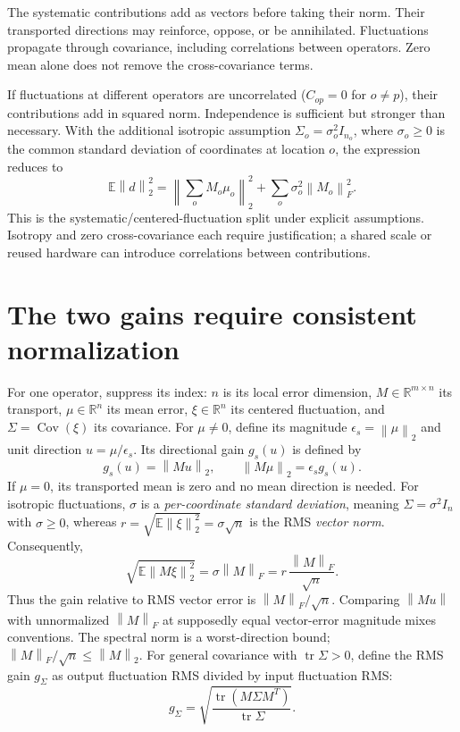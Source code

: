 \documentclass[10pt,a4paper]{article}
\newcommand{\R}{\mathbb{R}}
\newcommand{\E}{\mathbb{E}}
\newcommand{\norm}[1]{\left\lVert#1\right\rVert}
\DeclareMathOperator{\tr}{tr}
\DeclareMathOperator{\Cov}{Cov}
\begin{document}
The systematic contributions add as vectors before taking their norm.
Their transported directions may reinforce, oppose, or be annihilated.
Fluctuations propagate through covariance, including correlations between
operators. Zero mean alone does not remove the cross-covariance terms.

If fluctuations at different operators are uncorrelated ($C_{op}=0$ for
$o\ne p$), their contributions add in squared norm. Independence is sufficient
but stronger than necessary. With the additional isotropic assumption
$\Sigma_o=\sigma_o^2 I_{n_o}$, where $\sigma_o\geq0$ is the common standard
deviation of coordinates at location $o$, the expression reduces to
\begin{equation}
 \E\norm{d}_2^2=
 \left\lVert\sum_o M_o\mu_o\right\rVert_2^2
 +\sum_o\sigma_o^2\norm{M_o}_F^2.
 \label{sr:isotropic}
\end{equation}
This is the systematic/centered-fluctuation split under explicit assumptions.
Isotropy and zero cross-covariance each require justification; a shared scale
or reused hardware can introduce correlations between contributions.

\section{The two gains require consistent normalization}
For one operator, suppress its index: $n$ is its local error dimension,
$M\in\R^{m\times n}$ its transport, $\mu\in\R^n$ its mean error,
$\xi\in\R^n$ its centered fluctuation, and $\Sigma=\Cov(\xi)$ its covariance.
For $\mu\ne0$, define its magnitude $\epsilon_s=\norm{\mu}_2$ and unit
direction $u=\mu/\epsilon_s$. Its directional gain $g_s(u)$ is defined by
\begin{equation}
 g_s(u)=\norm{Mu}_2,\qquad \norm{M\mu}_2=\epsilon_s g_s(u).
 \label{sr:directional-gain}
\end{equation}
If $\mu=0$, its transported mean is zero and no mean direction is needed.
For isotropic fluctuations, $\sigma$ is a \emph{per-coordinate standard
deviation}, meaning $\Sigma=\sigma^2 I_n$ with $\sigma\geq0$, whereas
$r=\sqrt{\E\norm{\xi}_2^2}=\sigma\sqrt n$ is the RMS
\emph{vector norm}. Consequently,
\begin{equation}
 \sqrt{\E\norm{M\xi}_2^2}
 =\sigma\norm{M}_F
 =r\,\frac{\norm{M}_F}{\sqrt n}.
 \label{sr:isotropic-gain}
\end{equation}
Thus the gain relative to RMS vector error is $\norm{M}_F/\sqrt n$.
Comparing $\norm{Mu}$ with unnormalized $\norm{M}_F$ at supposedly equal
vector-error magnitude mixes conventions. The spectral norm is a worst-direction
bound; $\norm{M}_F/\sqrt n\leq\norm{M}_2$.
For general covariance with $\tr\Sigma>0$, define the RMS gain
$g_{\Sigma}$ as output fluctuation RMS divided by input fluctuation RMS:
\begin{equation}
 g_{\Sigma}=\sqrt{\frac{\tr(M\Sigma M^T)}{\tr\Sigma}}.
 \label{sr:covariance-gain}
\end{equation}
\end{document}
